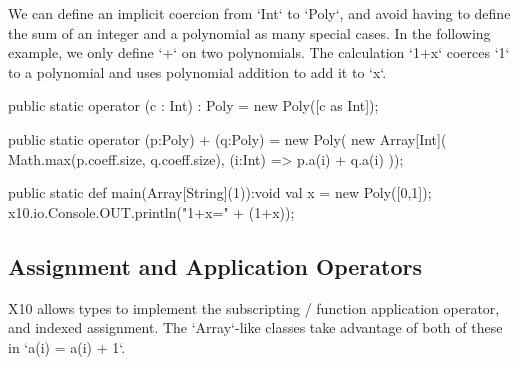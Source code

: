 \begin{ex}
We can define an implicit coercion from \xcd`Int` to \xcd`Poly`,
and avoid having to define the sum of an integer and a polynomial
as many special cases.  In the following example, we only define \xcd`+` on
two polynomials.  The
calculation \xcd`1+x` coerces \xcd`1` to a polynomial and uses polynomial
addition to add it to \xcd`x`.


\begin{xten}
  public static operator (c : Int) : Poly 
     = new Poly([c as Int]);

  public static operator (p:Poly) + (q:Poly) = new Poly(
      new Array[Int](
        Math.max(p.coeff.size, q.coeff.size),
        (i:Int) => p.a(i) + q.a(i)
     ));

  public static def main(Array[String](1)):void {
     val x = new Poly([0,1]);
     x10.io.Console.OUT.println("1+x=" + (1+x));
  }
\end{xten}
\end{ex}



\subsection{Assignment and Application Operators}
\index{()}
\index{()=}
\label{set-and-apply}
X10 allows types to implement the subscripting / function application
operator, and indexed assignment.  The \xcd`Array`-like classes take advantage
of both of these in \xcd`a(i) = a(i) + 1`.  


